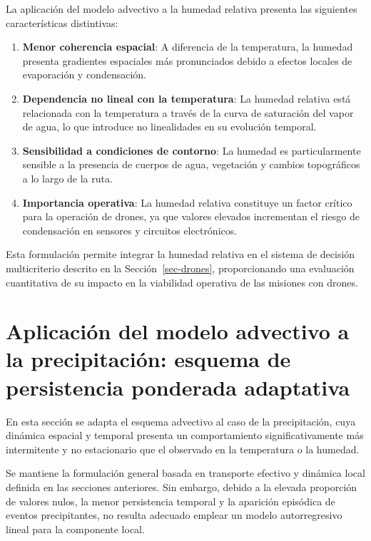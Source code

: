\documentclass[
  spanish,
  us-letterpaper,
]{scrreprt}
\numberwithin{equation}{section}
\begin{document}
La aplicación del modelo advectivo a la humedad relativa presenta las
siguientes características distintivas:

\begin{enumerate}
\def\labelenumi{\arabic{enumi}.}
\item
  \textbf{Menor coherencia espacial}: A diferencia de la temperatura, la
  humedad presenta gradientes espaciales más pronunciados debido a
  efectos locales de evaporación y condensación.
\item
  \textbf{Dependencia no lineal con la temperatura}: La humedad relativa
  está relacionada con la temperatura a través de la curva de saturación
  del vapor de agua, lo que introduce no linealidades en su evolución
  temporal.
\item
  \textbf{Sensibilidad a condiciones de contorno}: La humedad es
  particularmente sensible a la presencia de cuerpos de agua, vegetación
  y cambios topográficos a lo largo de la ruta.
\item
  \textbf{Importancia operativa}: La humedad relativa constituye un
  factor crítico para la operación de drones, ya que valores elevados
  incrementan el riesgo de condensación en sensores y circuitos
  electrónicos.
\end{enumerate}

Esta formulación permite integrar la humedad relativa en el sistema de
decisión multicriterio descrito en la Sección~\ref{sec-drones},
proporcionando una evaluación cuantitativa de su impacto en la
viabilidad operativa de las misiones con drones.

\section{Aplicación del modelo advectivo a la precipitación: esquema de
persistencia ponderada
adaptativa}\label{aplicaciuxf3n-del-modelo-advectivo-a-la-precipitaciuxf3n-esquema-de-persistencia-ponderada-adaptativa}

En esta sección se adapta el esquema advectivo al caso de la
precipitación, cuya dinámica espacial y temporal presenta un
comportamiento significativamente más intermitente y no estacionario que
el observado en la temperatura o la humedad.

Se mantiene la formulación general basada en transporte efectivo y
dinámica local definida en las secciones anteriores. Sin embargo, debido
a la elevada proporción de valores nulos, la menor persistencia temporal
y la aparición episódica de eventos precipitantes, no resulta adecuado
emplear un modelo autorregresivo lineal para la componente local.
\end{document}
